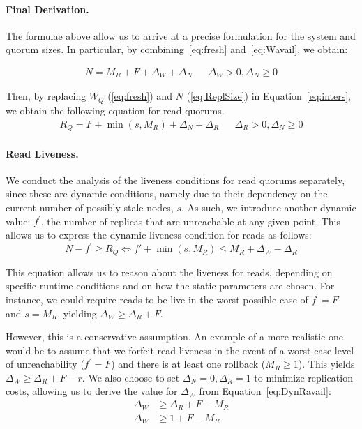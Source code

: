\paragraph{Final Derivation.}
The formulae above allow us to arrive at a precise formulation
for the system and quorum sizes. In particular, by
combining~\ref{eq:fresh} and~\ref{eq:Wavail}, we obtain:

\begin{align} \label{eq:ReplSize}
  N = M_R + F + \Delta_W + \Delta_N && \Delta_W > 0, \Delta_N \geq 0
\end{align}

Then, by replacing $W_Q$ (\ref{eq:fresh}) and $N$
(\ref{eq:ReplSize}) in Equation~\ref{eq:inters}, we obtain the
following equation for read quorums.
\begin{align}\label{eq:ReadSize}
  R_Q = F + \min(s, M_R) + \Delta_N + \Delta_R && \Delta_R > 0, \Delta_N \geq 0
\end{align}

\paragraph{Read Liveness.}
We conduct the analysis of the liveness conditions for read
quorums separately, since these are dynamic conditions, namely
due to their dependency on the current number of possibly stale
nodes, $s$.  As such, we introduce another dynamic value: $f^{\prime}$,
the number of replicas that are unreachable at any given point.
This allows us to express the dynamic liveness condition for
reads as follows:
\begin{equation}\label{eq:DynRavail}
    N - f^{\prime} \geq R_Q  \Leftrightarrow f' + \min(s, M_R) \leq M_R + \Delta_W - \Delta_R
\end{equation}

This equation allows us to reason about the liveness for reads,
depending on specific runtime conditions and on how the static
parameters are chosen. For instance, we could require reads to be
live in the worst possible case of $f^{\prime} = F$ and $s = M_R$, yielding
$\Delta_W \geq \Delta_R + F$.

However, this is a conservative assumption. An example of a more
realistic one would be to assume that we forfeit read liveness in
the event of a worst case level of unreachability ($f^{\prime} = F$) and
there is at least one rollback ($M_R \geq 1$). This yields
$\Delta_W \geq \Delta_R + F - r$. We also choose to set
$\Delta_N=0,\Delta_R=1$ to minimize replication costs, allowing
us to derive the value for $\Delta_W$ from
Equation~\ref{eq:DynRavail}:
\begin{align} \label{eq:deployment1}
  \Delta_W &\geq  \Delta_R + F - M_R\\
  \Delta_W &\geq  1 + F - M_R
\end{align}

